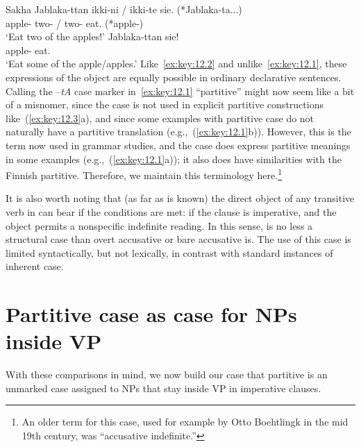 \documentclass[output=paper]{langsci/langscibook}
\begin{document}
\ea\label{ex:key:12.3}Sakha
	\ea
		\gll Jablaka-ttan   ikki-ni / ikki-te sie. (*Jablaka-ta...)\\
			apple-\Abl{}      two-\Acc{} / two-\Part{}  eat.\Imp{} (*apple-\Part{})\\
		\glt ‘Eat two of the apples!’
	\ex
		\gll Jablaka-ttan sie!\\
			apple-\Abl{} eat.\Imp{}\\
		\glt ‘Eat some of the apple/apples.’
	\z
\z
Like~\eqref{ex:key:12.2} and unlike~\eqref{ex:key:12.1}, these expressions of the object are equally possible
in ordinary declarative sentences. Calling the –\emph{tA} case marker in~\eqref{ex:key:12.1}
“partitive” might now seem like a bit of a misnomer, since the case is not used
in explicit partitive constructions like~(\ref{ex:key:12.3}a), and since some examples with
partitive case do not naturally have a partitive translation (e.g.,~(\ref{ex:key:12.1}b)).
However, this is the term now used in  grammar studies, and the case does
express partitive meanings in some examples (e.g.,~(\ref{ex:key:12.1}a)); it also does have
similarities with the Finnish partitive. Therefore, we maintain this
terminology here.\footnote{An older term for this case, used for example by
Otto Boehtlingk in the mid 19th century, was “accusative
indefinite.”}

It is also worth noting that (as far as is known) the direct object of any
transitive verb in  can bear  if the conditions are met: if
the clause is imperative, and the object permits a nonspecific indefinite
reading.  In this sense,  is no less a structural case than overt
accusative or bare accusative is. The use of this case is limited
syntactically, but not lexically, in contrast with standard instances of
inherent case.

\section{Partitive case as case for NPs inside VP}

With these comparisons in mind, we now build our case that partitive is an
unmarked case assigned to NPs that stay inside VP in imperative clauses.
\end{document}
